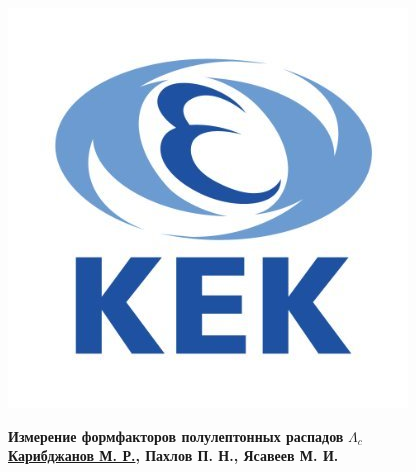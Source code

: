 \documentclass[a0,portrait]{a0poster}
\begin{document}
\begin{mdframed}[style=MyFrame]
\vspace{0.5cm} 
    \begin{minipage}[b]{0.1\linewidth}
        \centering
        \includegraphics[width=1\linewidth]{img/KEK_logo.jpg}
    \end{minipage}
    \begin{minipage}[b]{0.75\linewidth}
        \centering
        {\Huge{\textbf{Измерение формфакторов полулептонных распадов}} $\Lambda_c$} \\ \vspace{1em}
        {\huge \textbf{\underline{Карибджанов М. Р.}, Пахлов П. Н., Ясавеев М. И.}} \\[0.5em]
    \end{minipage}
    \begin{minipage}[b]{0.1\linewidth}
        \centering

\end{minipage}
\end{mdframed}
\end{document}
